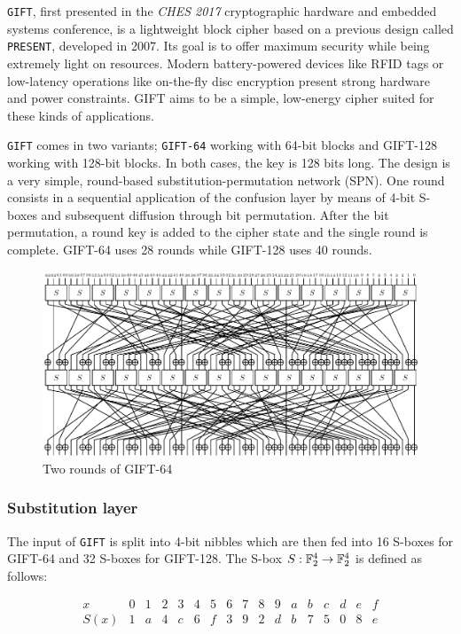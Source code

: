 \texttt{GIFT}\cite{gift:2017}, first presented in the \textit{CHES 2017}
cryptographic hardware and embedded systems conference, is a lightweight block
cipher based on a previous design called \texttt{PRESENT}, developed in 2007. Its
goal is to offer maximum security while being extremely light on resources.
Modern battery-powered devices like RFID tags or low-latency operations like
on-the-fly disc encryption present strong hardware and power constraints. GIFT
aims to be a simple, low-energy cipher suited for these kinds of applications.

\texttt{GIFT} comes in two variants; \verb|GIFT-64| working with 64-bit blocks
and GIFT-128 working with 128-bit blocks. In both cases, the key is 128
bits long. The design is a very simple, round-based substitution-permutation
network (SPN). One round consists in a sequential application of the confusion
layer by means of 4-bit S-boxes and subsequent diffusion through bit
permutation. After the bit permutation, a round key is added to the cipher
state and the single round is complete. GIFT-64 uses 28 rounds while
GIFT-128 uses 40 rounds.

\begin{figure}[h!]
    \centering
    \includegraphics[width=\textwidth]{Figures/GIFT-64.pdf}
    \caption{Two rounds of GIFT-64}
\end{figure}

\subsubsection{Substitution layer}

The input of \texttt{GIFT} is split into 4-bit nibbles which are then fed into
16 S-boxes for GIFT-64 and 32 S-boxes for GIFT-128. The S-box
$S:\mathbb{F}_2^{4}\rightarrow \mathbb{F}_2^{4}$ is defined as follows:

\[
    \begin{array}{l|cccccccccccccccc}
        x & 0 & 1 & 2 & 3 & 4 & 5 & 6 & 7 & 8 & 9 & a & b & c & d & e & f \\
        \hline
        S(x) & 1 & a & 4 & c & 6 & f & 3 & 9 & 2 & d & b & 7 & 5 & 0 & 8 & e
    \end{array}
\]

